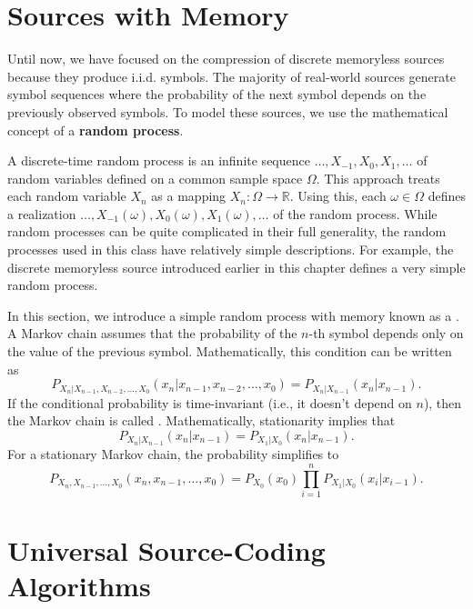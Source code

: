 \section{Sources with Memory}

Until now, we have focused on the compression of discrete memoryless sources because they produce i.i.d. symbols.
The majority of real-world sources generate symbol sequences where the probability of the next symbol depends on the previously observed symbols.
To model these sources, we use the mathematical concept of a  \textbf{random process}.

A discrete-time random process is an infinite sequence $\ldots,X_{-1},X_0,X_1,\ldots$ of random variables defined on a common sample space $\Omega$.
This approach treats each random variable $X_n$ as a mapping $X_n : \Omega \rightarrow \mathbb{R}$.
Using this, each $\omega\in \Omega$ defines a realization $\ldots,X_{-1} (\omega),X_0 (\omega), X_1 (\omega),\ldots$ of the random process.
While random processes can be quite complicated in their full generality, the random processes used in this class have relatively simple descriptions.
For example, the discrete memoryless source introduced earlier in this chapter defines a very simple random process.

In this section, we introduce a simple random process with memory known as a .
A Markov chain assumes that the probability of the $n$-th symbol depends only on the value of the previous symbol.
Mathematically, this condition can be written as
\[ P_{X_n | X_{n-1},X_{n-2},\ldots,X_0} (x_n | x_{n-1},x_{n-2},\ldots,x_0 ) =  P_{X_n | X_{n-1}}(x_n | x_{n-1} ). \]
If the conditional probability is time-invariant (i.e., it doesn't depend on $n$), then the Markov chain is called .
Mathematically, stationarity implies that
\[ P_{X_n | X_{n-1}}(x_n | x_{n-1} ) = P_{X_1 | X_0}(x_n | x_{n-1}). \]
For a stationary Markov chain, the probability simplifies to
\[ P_{X_n , X_{n-1}, \ldots, X_0} (x_n,x_{n-1},\ldots,x_0 ) = P_{X_0}(x_0) \prod_{i=1}^{n} P_{X_1 | X_0} (x_i | x_{i-1} ). \]


\section{Universal Source-Coding Algorithms}

